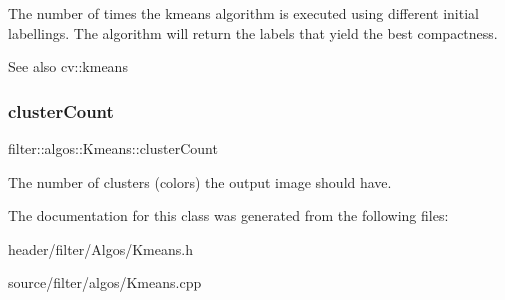 The number of times the kmeans algorithm is executed using different initial labellings. The algorithm will return the labels that yield the best compactness. \begin{DoxySeeAlso}{See also}
cv\+::kmeans 
\end{DoxySeeAlso}
\mbox{\label{classfilter_1_1algos_1_1_kmeans_a14f679e68a64bab5f4becf3b99b962cb}} 
\subsubsection{\texorpdfstring{cluster\+Count}{clusterCount}}
{\footnotesize\ttfamily filter\+::algos\+::\+Kmeans\+::cluster\+Count}

The number of clusters (colors) the output image should have. 

The documentation for this class was generated from the following files\+:\begin{DoxyCompactItemize}
\item 
header/filter/\+Algos/Kmeans.\+h\item 
source/filter/algos/Kmeans.\+cpp\end{DoxyCompactItemize}
